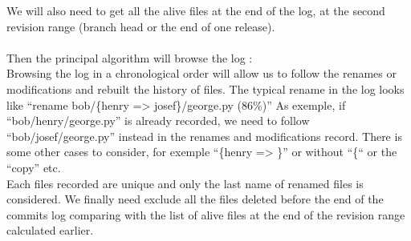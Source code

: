 We will also need to get all the alive files at the end of the log, at the second revision range (branch head or the end of one release).\\\\
Then the principal algorithm will browse the log :\\
Browsing the log in a chronological order will allow us to follow the renames or modifications and rebuilt the history of files.
The typical rename in the log looks like “rename bob/\{henry => josef\}/george.py (86\%)”
As exemple, if “bob/henry/george.py” is already recorded, we need to follow “bob/josef/george.py” instead in the renames and modifications record.
There is some other cases to consider, for exemple “\{henry => \}” or without “\{“ or the “copy” etc.\\
Each files recorded are unique and only the last name of renamed files is considered.
We finally need exclude all the files deleted before the end of the commits log comparing with the list of alive files at the end of the revision range calculated earlier.\\ 	
\label{subsec:Process}
		
\label{sec:methodology}
